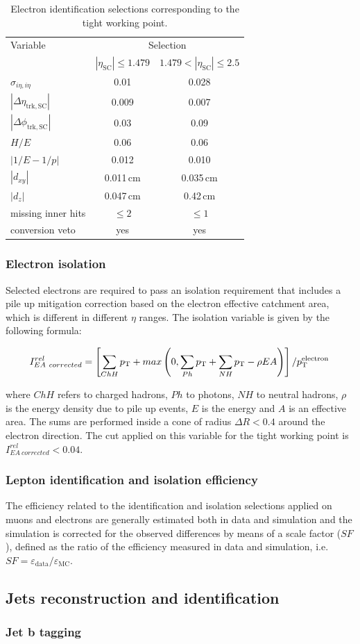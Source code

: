 \begin{table}[htb]
\caption{Electron identification selections corresponding to the tight working point.}\label{tab:tightele}
\begin{tabular}{lcc}
\toprule
Variable & \multicolumn{2}{c}{Selection}\\
 & $|\eta_\mathrm{SC}|\leq 1.479$ & $1.479 < |\eta_\mathrm{SC}| \leq 2.5$ \\
\midrule
$\sigma_{i\eta,i\eta}$ & 0.01 & 0.028 \\
$|\Delta\eta_\mathrm{trk,SC}|$ & 0.009 & 0.007 \\
$|\Delta\phi_\mathrm{trk,SC}|$ & 0.03 & 0.09 \\
$H/E$ & 0.06 & 0.06 \\
$|1/E - 1/p|$ & 0.012 & 0.010 \\
$|d_{xy}|$ & 0.011\,cm & 0.035\,cm\\
$|d_{z}|$ & 0.047\,cm & 0.42\,cm\\
missing inner hits & $\leq 2$ & $\leq 1$\\
conversion veto & yes & yes \\
\bottomrule
\end{tabular}
\end{table}

\subsubsection{Electron isolation}
Selected electrons are required to pass an isolation requirement that includes a pile up mitigation correction based on the electron effective catchment area, which is different in different $\eta$ ranges. The isolation variable is given by the following formula:

\begin{equation}
I^{rel}_{EA~corrected} = \left[ \sum_{ChH}p_\mathrm{T} + max\left( 0, \sum_{Ph}p_\mathrm{T} + \sum_{NH}p_\mathrm{T} - \rho EA \right) \right]/p_\mathrm{T}^\mathrm{electron} \,
\end{equation}

where $ChH$ refers to charged hadrons, $Ph$ to photons, $NH$ to neutral hadrons, $\rho$ is the energy density due to pile up events, $E$ is the energy and $A$ is an effective area. The sums are performed inside a cone of radius $\Delta R < 0.4$ around the electron direction. The cut applied on this variable for the tight working point is $I^{rel}_{EA~corrected} < 0.04$.

\subsubsection{Lepton identification and isolation efficiency}
The efficiency related to the identification and isolation selections applied on muons and electrons are generally estimated both in data and simulation and the simulation is corrected for the observed differences by means of a scale factor ($SF$), defined as the ratio of the efficiency measured in data and simulation, i.e. $SF = \varepsilon_\mathrm{data}/\varepsilon_\mathrm{MC}$.

	
\subsection{Jets reconstruction and identification}\label{chap2:jets}

	\subsubsection{Jet b tagging}
